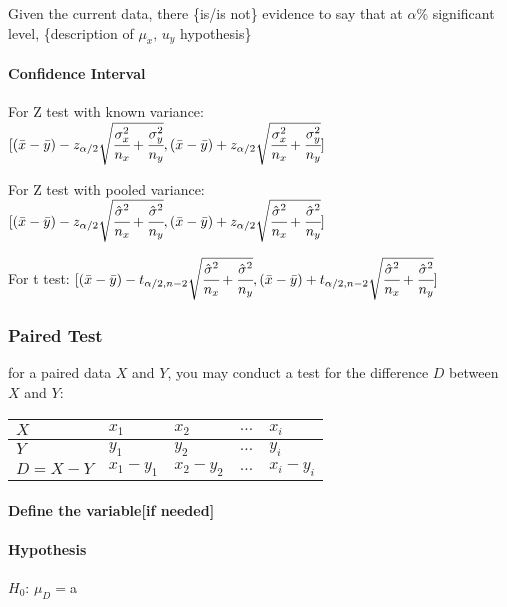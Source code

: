\documentclass[]{article}
\let\oldparagraph\paragraph
\renewcommand{\paragraph}[1]{\oldparagraph{#1}\mbox{}}
\begin{document}
Given the current data, there \{is/is not\} evidence to say that at
\(\alpha\)\% significant level, \{description of \(\mu_x,\,u_y\)
hypothesis\}

\paragraph{Confidence Interval}\label{header-n154}

For Z test with known variance:
\([(\bar{x} - \bar{y}) - z_{\alpha/2}\sqrt{\cfrac{{\sigma}^2_x}{n_x} + \cfrac{{\sigma}^2_y}{n_y}},(\bar{x} - \bar{y}) + z_{\alpha/2}\sqrt{\cfrac{{\sigma}^2_x}{n_x} + \cfrac{{\sigma}^2_y}{n_y}}]\)

For Z test with pooled variance:
\([(\bar{x} - \bar{y}) - z_{\alpha/2}\sqrt{\cfrac{\hat{\sigma}^2}{n_x} + \cfrac{\hat{\sigma}^2}{n_y}},(\bar{x} - \bar{y}) + z_{\alpha/2}\sqrt{\cfrac{\hat{\sigma}^2}{n_x} + \cfrac{\hat{\sigma}^2}{n_y}}]\)

For t test:
\([(\bar{x} - \bar{y}) - t_{\alpha/2,n-2}\sqrt{\cfrac{\hat{\sigma}^2}{n_x} + \cfrac{\hat{\sigma}^2}{n_y}},(\bar{x} - \bar{y}) + t_{\alpha/2,n-2}\sqrt{\cfrac{\hat{\sigma}^2}{n_x} + \cfrac{\hat{\sigma}^2}{n_y}}]\)

\subsubsection{Paired Test}\label{header-n158}

for a paired data \(X\) and \(Y\), you may conduct a test for the
difference \(D\) between \(X\) and \(Y\):

\begin{longtable}[]{@{}lllll@{}}
\toprule
\(X\) & \(x_1\) & \(x_2\) & \(\dots\) & \(x_i\)\tabularnewline
\midrule
\endhead
\(Y\) & \(y_1\) & \(y_2\) & \(\dots\) & \(y_i\)\tabularnewline
\(D = X-Y\) & \(x_1 - y_1\) & \(x_2 - y_2\) & \(\dots\) &
\(x_i - y_i\)\tabularnewline
\bottomrule
\end{longtable}

\paragraph{Define the variable{[}if needed{]}}\label{header-n179}

\paragraph{Hypothesis}\label{header-n180}

\(H_0\): \(\mu_D= \)a
\end{document}
